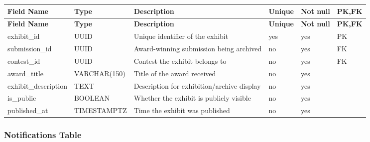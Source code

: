 \vspace{0.5em}
\renewcommand{\arraystretch}{1.15}
\setlength{\tabcolsep}{4pt}
\small
\begin{longtable}{|>{\raggedright\arraybackslash}p{}|>{\raggedright\arraybackslash}p{}|>{\raggedright\arraybackslash}p{}|>{\centering\arraybackslash}p{}|>{\centering\arraybackslash}p{}|>{\centering\arraybackslash}p{}|}
\hline
\textbf{Field Name} & \textbf{Type} & \textbf{Description} & \textbf{Unique} & \textbf{Not null} & \textbf{PK,FK} \\
\hline
\endfirsthead
\textbf{Field Name} & \textbf{Type} & \textbf{Description} & \textbf{Unique} & \textbf{Not null} & \textbf{PK,FK} \\
\hline
\endhead
exhibit\_id & UUID & Unique identifier of the exhibit & yes & yes & PK \\
\hline
submission\_id & UUID & Award-winning submission being archived & no & yes & FK \\
\hline
contest\_id & UUID & Contest the exhibit belongs to & no & yes & FK \\
\hline
award\_title & VARCHAR(150) & Title of the award received & no & yes & \\
\hline
exhibit\_description & TEXT & Description for exhibition/archive display & no & yes & \\
\hline
is\_public & BOOLEAN & Whether the exhibit is publicly visible & no & yes & \\
\hline
published\_at & TIMESTAMPTZ & Time the exhibit was published & no & yes & \\
\hline
\end{longtable}

\vspace{1em}
\subsubsection{Notifications Table}
\label{subsubsec:notifications-table}

